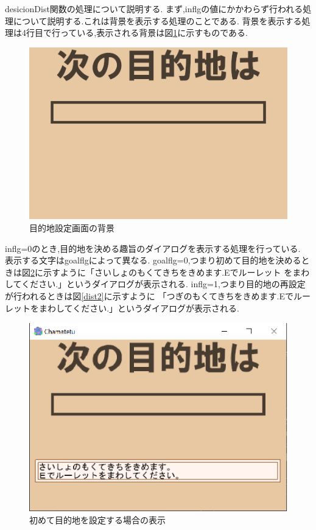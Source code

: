 \documentclass[a4j]{jarticle}
\begin{document}
        desicionDist関数の処理について説明する.
        まず,inflgの値にかかわらず行われる処理について説明する.これは背景を表示する処理のことである.
        背景を表示する処理は4行目で行っている,表示される背景は図\ref{distback}に示すものである.

        \begin{figure}[H]
            \centering
            \includegraphics[scale=1.7]{sp3.png}
            \caption{目的地設定画面の背景}
             \label{distback}
            \end{figure} 
        
        inflg=0のとき,目的地を決める趣旨のダイアログを表示する処理を行っている. 表示する文字はgoalflgによって異なる.
        goalflg=0,つまり初めて目的地を決めるときは図\ref{dist1}に示すように「さいしょのもくてきちをきめます.Eでルーレット
        をまわしてください.」というダイアログが表示される. inflg=1,つまり目的地の再設定が行われるときは図\ref{dist2}に示すように
        「つぎのもくてきちをきめます.Eでルーレットをまわしてください.」というダイアログが表示される. 

        \begin{figure}[H]
            \centering
            \includegraphics[scale=1.3]{distflg0.eps}
            \caption{初めて目的地を設定する場合の表示}
             \label{dist1}
            \end{figure} 
        
\end{document}
